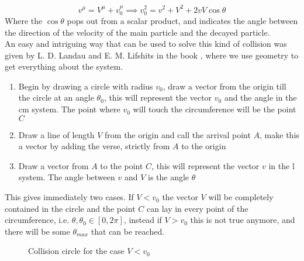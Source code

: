 \documentclass[../admech.tex]{subfiles}
\begin{document}
\begin{equation}
	v^\mu=V^\mu+v_0^\mu\implies v^2_0=v^2+V^2+2vV\cos\theta
	\label{eq:decayspeedV}
\end{equation}
Where the $\cos\theta$ pops out from a scalar product, and indicates the angle between the direction of the velocity of the main particle and the decayed particle.\\
An easy and intriguing way that can be used to solve this kind of collision was given by L. D. Landau and E. M. Lifshits in the book \cite{landau1}, where we use geometry to get everything about the system.\\
\begin{enumerate}
	\item Begin by drawing a circle with radius $v_0$, draw a vector from the origin till the circle at an angle $\theta_0$, this will represent the vector $v_0$ and the angle in the cm system. The point where $v_0$ will touch the circumference will be the point $C$
	\item Draw a line of length $V$ from the origin and call the arrival point $A$, make this a vector by adding the verse, strictly from $A$ to the origin
	\item Draw a vector from $A$ to the point $C$, this will represent the vector $v$ in the l system. The angle between $v$ and $V$ is the angle $\theta$
\end{enumerate}
This gives immediately two cases. If $V<v_0$ the vector $V$ will be completely contained in the circle and the point $C$ can lay in every point of the circumference, i.e. $\theta,\theta_0\in[0,2\pi]$, instead if $V>v_0$ this is not true anymore, and there will be some $\theta_{max}$ that can be reached.\\
\begin{minipage}[c]{0.5\textwidth}
	\begin{figure}[H]
		\centering
		\caption{Collision circle for the case $V<v_0$}
		\label{fig:discirc1}
	\end{figure}
\end{minipage}
\end{document}
